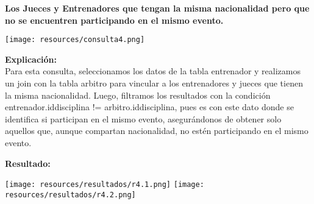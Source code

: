 \textbf{Los Jueces y Entrenadores que tengan la misma nacionalidad pero que no se encuentren participando en
el mismo evento.}\vspace{.3cm}

\begin{center}
	\texttt{[image: resources/consulta4.png]}
\end{center} 
\textbf{Explicación:} \\
Para esta consulta, seleccionamos los datos de la tabla entrenador y realizamos un join con la tabla arbitro para vincular a los entrenadores y jueces que tienen la misma nacionalidad. Luego, filtramos los resultados con la condición entrenador.iddisciplina != arbitro.iddisciplina, pues es con este dato donde se identifica si participan en el mismo evento, asegurándonos de obtener solo aquellos que, aunque compartan nacionalidad, no estén participando en el mismo evento.
 \vspace{.3cm}

\textbf{Resultado:}
\begin{center}
	\texttt{[image: resources/resultados/r4.1.png]}
	\texttt{[image: resources/resultados/r4.2.png]}
\end{center} 